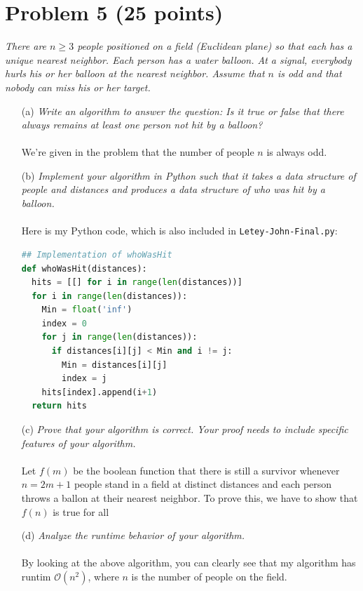\documentclass[12pt]{article}
\begin{document}
{\section*{{\selectfont Problem 5 (25 points)}}\vspace{-10mm}
\textsl{There are $n \geq 3$ people positioned on a field (Euclidean plane) so that each has a unique nearest neighbor. Each person has a water balloon. At a signal, everybody hurls his or her balloon at the nearest neighbor. Assume that $n$ is odd and that nobody can miss his or her target.}
\begin{enumerate}
\item[(a)]\textsl{Write an algorithm to answer the question: Is it true or false that there always remains at least one person not hit by a balloon?}\\ \\
We're given in the problem that the number of people $n$ is always odd. 
\item[(b)]\textsl{Implement your algorithm in Python such that it takes a data structure of people and distances and produces a data structure of who was hit by a balloon.}\\ \\
Here is my Python code, which is also included in \texttt{Letey-John-Final.py}:
\begin{lstlisting}[language=Python]
## Implementation of whoWasHit
def whoWasHit(distances):
  hits = [[] for i in range(len(distances))]
  for i in range(len(distances)):
    Min = float('inf')
    index = 0
    for j in range(len(distances)):
      if distances[i][j] < Min and i != j:
        Min = distances[i][j]
        index = j
    hits[index].append(i+1)
  return hits
\end{lstlisting}
\item[(c)]\textsl{Prove that your algorithm is correct. Your proof needs to include specific features of your algorithm.}\\ \\
Let $f(m)$ be the boolean function that there is still a survivor whenever $n = 2m + 1$ people stand in a field at distinct distances and each person throws a ballon at their nearest neighbor. To prove this, we have to show that $f(n)$ is true for all 
\item[(d)]\textsl{Analyze the runtime behavior of your algorithm.}\\ \\
By looking at the above algorithm, you can clearly see that my algorithm has runtim $\boxed{\mathcal{O}(n^2)}$, where $n$ is the number of people on the field.
\end{enumerate}
}
\end{document}
